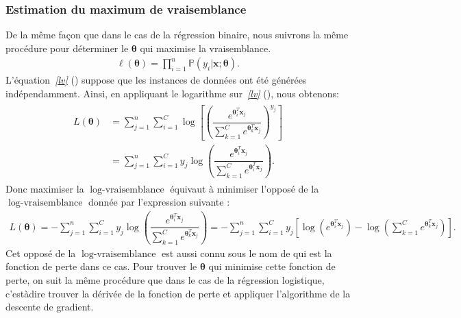 \documentclass[letterpaper,11pt,english]{sphinxmanual}
\begin{document}
\subsubsection{Estimation du maximum de vraisemblance}
\label{\detokenize{chapter3:id2}}
\sphinxAtStartPar
De la même façon que dans le cas de la régression binaire, nous suivrons
la même procédure pour déterminer le \(\boldsymbol{\theta}\) qui
maximise la vraisemblance.
\begin{equation}\label{equation:chapter3:chapter3:43}
\begin{split}\ell(\boldsymbol{\theta})= \prod_{i=1}^{n}\mathbb{P}(y_{i}|\mathbf{x};\boldsymbol{\theta}).\end{split}
\end{equation}
\sphinxAtStartPar
L’équation {\hyperref[\detokenize{chapter3:lv}]{\emph{{[}lv{]}}}} () suppose que les instances de données ont été
générées indépendamment. Ainsi, en appliquant le logarithme
sur {\hyperref[\detokenize{chapter3:lv}]{\emph{{[}lv{]}}}} (), nous obtenons:
\begin{equation}\label{equation:chapter3:chapter3:44}
\begin{split}\begin{aligned}
    L(\boldsymbol{\theta})&=\sum_{j=1}^{n}\sum_{i=1}^{C} \log\left[\left(\dfrac{e^{\boldsymbol{\theta}_{i}^T \mathbf{x}_{j}}} {\sum_{k=1}^{C} e^{\boldsymbol{\theta}_{k}^T \mathbf{x}_{j}}}\right)^{y_{j}}\right]\\
    &=\sum_{j=1}^{n}\sum_{i=1}^{C}y_{j}\log\left(\dfrac{e^{\boldsymbol{\theta}^{T}_i \mathbf{x}_{j}}} {\displaystyle\sum_{k=1}^{C} e^{\boldsymbol{\theta}^{T}_i \mathbf{x}_{j}}}\right).\end{aligned}\end{split}
\end{equation}
\sphinxAtStartPar
Donc maximiser la \(\operatorname{log-vraisemblance}\) équivaut à
minimiser l’opposé de la \(\operatorname{log-vraisemblance}\) donnée
par l’expression suivante :
\begin{equation}\label{equation:chapter3:chapter3:45}
\begin{split}L(\boldsymbol{\theta})= -\sum_{j=1}^{n}\sum_{i=1}^{C}y_{j}\log\left(\dfrac{e^{\boldsymbol{\theta}_{i}^T \mathbf{x}_{j}}} {\sum_{k=1}^{C} e^{\boldsymbol{\theta}^{T}_k \mathbf{x}_{j}}}\right)
  =- \sum_{j=1}^{n}\sum_{i=1}^{C}y_{j}\left[\log\left(e^{\boldsymbol{\theta}_{i}^T \mathbf{x}_{j}} \right) - \log\left( \displaystyle\sum_{k=1}^{C} e^{\boldsymbol{\theta}_{k}^T \mathbf{x}_{j}} \right)\right].\end{split}
\end{equation}
\sphinxAtStartPar
Cet opposé de la \(\operatorname{log-vraisemblance}\) est aussi
connu sous le nom de  qui est
la fonction de perte dans ce cas. Pour trouver le
\(\boldsymbol{\theta}\) qui minimise cette fonction de perte, on
suit la même procédure que dans le cas de la régression logistique,
c’est\sphinxhyphen{}à\sphinxhyphen{}dire trouver la dérivée de la fonction de perte et appliquer
l’algorithme de la descente de gradient.
\end{document}
